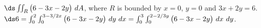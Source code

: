 {$\ds \iint_R \big(6-3x-2y\big)\ dA$, where $R$ is bounded by $x=0$, $y=0$ and $3x+2y=6$. 
}
{$\ds 6 = \int_{0}^2\int_{0}^{3-3/2x}\big(6-3x-2y\big)\ dy\ dx = \int_{0}^3\int_{0}^{2-2/3y}\big(6-3x-2y\big)\ dx\ dy$.
}
